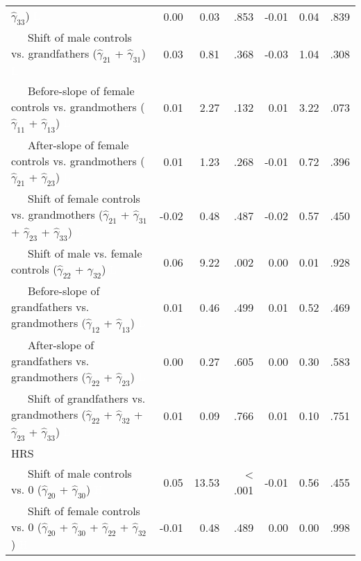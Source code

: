 \documentclass[
  english,
  man,floatsintext]{apa7}
\newenvironment{lltable}{\begin{landscape}\begin{center}\begin{ThreePartTable}}{\end{ThreePartTable}\end{center}\end{landscape}}
\begin{document}
\begin{lltable}
{\begin{longtable}{lrrrrrr}
                              $\hat{\gamma}_{33}$) \textcolor{white}{L} & 0.00 & 0.03 & .853 & -0.01 & 0.04 & .839\\
\ \ \ Shift of male controls vs. grandfathers 
                              ($\hat{\gamma}_{21}$ + $\hat{\gamma}_{31}$) \textcolor{white}{L} & 0.03 & 0.81 & .368 & -0.03 & 1.04 & .308\\
\ \ \ Before-slope of female controls vs. grandmothers 
                              ($\hat{\gamma}_{11}$ + $\hat{\gamma}_{13}$) \textcolor{white}{L} & 0.01 & 2.27 & .132 & 0.01 & 3.22 & .073\\
\ \ \ After-slope of female controls vs. grandmothers 
                              ($\hat{\gamma}_{21}$ + $\hat{\gamma}_{23}$) \textcolor{white}{L} & 0.01 & 1.23 & .268 & -0.01 & 0.72 & .396\\
\ \ \ Shift of female controls vs. grandmothers 
                              ($\hat{\gamma}_{21}$ + $\hat{\gamma}_{31}$ + 
                              $\hat{\gamma}_{23}$ + $\hat{\gamma}_{33}$) \textcolor{white}{L} & -0.02 & 0.48 & .487 & -0.02 & 0.57 & .450\\
\ \ \ Shift of male vs. female controls 
                              ($\hat{\gamma}_{22}$ + $\hat{\gamma}_{32}$) \textcolor{white}{L} & 0.06 & 9.22 & .002 & 0.00 & 0.01 & .928\\
\ \ \ Before-slope of grandfathers vs. grandmothers 
                              ($\hat{\gamma}_{12}$ + $\hat{\gamma}_{13}$) \textcolor{white}{L} & 0.01 & 0.46 & .499 & 0.01 & 0.52 & .469\\
\ \ \ After-slope of grandfathers vs. grandmothers 
                              ($\hat{\gamma}_{22}$ + $\hat{\gamma}_{23}$) \textcolor{white}{L} & 0.00 & 0.27 & .605 & 0.00 & 0.30 & .583\\
\ \ \ Shift of grandfathers vs. grandmothers 
                              ($\hat{\gamma}_{22}$ + $\hat{\gamma}_{32}$ + 
                              $\hat{\gamma}_{23}$ + $\hat{\gamma}_{33}$) \textcolor{white}{L} & 0.01 & 0.09 & .766 & 0.01 & 0.10 & .751\\
HRS &  &  &  &  &  & \\
\ \ \ Shift of male controls vs. 0 ($\hat{\gamma}_{20}$ + 
                              $\hat{\gamma}_{30}$) \textcolor{white}{H} & 0.05 & 13.53 & < .001 & -0.01 & 0.56 & .455\\
\ \ \ Shift of female controls vs. 0 ($\hat{\gamma}_{20}$ + 
                              $\hat{\gamma}_{30}$ + $\hat{\gamma}_{22}$ + 
                              $\hat{\gamma}_{32}$) \textcolor{white}{H} & -0.01 & 0.48 & .489 & 0.00 & 0.00 & .998\\

\end{longtable}}
\end{lltable}
\end{document}
